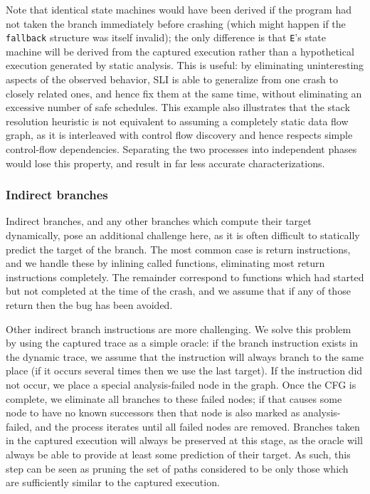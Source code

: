 \documentclass[10pt,twocolumn,preprint,natbib,authoryear]{sigplanconf}
\newcommand{\editorial}[1]{}
\begin{document}
Note that identical state machines would have been derived if the
program had not taken the branch immediately before crashing (which
might happen if the \verb|fallback| structure was itself invalid); the
only difference is that \verb|E|'s state machine will be derived from
the captured execution rather than a hypothetical execution generated
by static analysis.  This is useful: by eliminating uninteresting
aspects of the observed behavior, SLI is able to generalize from one
crash to closely related ones, and hence fix them at the same time,
without eliminating an excessive number of safe schedules.  This
example also illustrates that the stack resolution heuristic is not
equivalent to assuming a completely static data flow graph, as it is
interleaved with control flow discovery and hence respects simple
control-flow dependencies.  Separating the two processes into
independent phases would lose this property, and result in far less
accurate characterizations.\editorial{ref phase order problem?}

\subsubsection{Indirect branches}
Indirect branches, and any other branches which compute their target
dynamically, pose an additional challenge here, as it is often
difficult to statically predict the target of the branch.  The most
common case is return instructions, and we handle these by inlining
called functions, eliminating most return instructions completely.
The remainder correspond to functions which had started but not
completed at the time of the crash, and we assume that if any of those
return then the bug has been avoided.\editorial{This should be much
  earlier!}

Other indirect branch instructions are more challenging.  We solve
this problem by using the captured trace as a simple oracle: if the
branch instruction exists in the dynamic trace, we assume that the
instruction will always branch to the same place (if it occurs several
times then we use the last target).  If the instruction did not occur,
we place a special analysis-failed node in the graph.  Once the CFG is
complete, we eliminate all branches to these failed nodes; if that
causes some node to have no known successors then that node is also
marked as analysis-failed, and the process iterates until all failed
nodes are removed.  Branches taken in the captured execution will
always be preserved at this stage, as the oracle will always be able
to provide at least some prediction of their target.  As such, this
step can be seen as pruning the set of paths considered to be only
those which are sufficiently similar to the captured execution.
\end{document}

